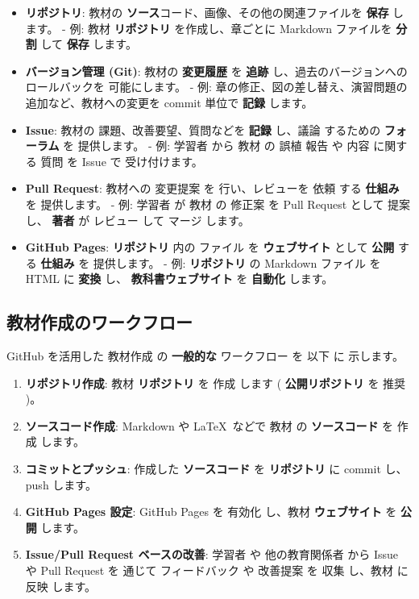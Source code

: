 \begin{itemize}
    \item \textbf{リポジトリ}: 教材の \textbf{ソース}コード、画像、その他の関連ファイルを \textbf{保存} します。
        - 例: 教材 \textbf{リポジトリ} を作成し、章ごとに Markdown ファイルを \textbf{分割} して \textbf{保存} します。
    \item \textbf{バージョン管理 (Git)}: 教材の \textbf{変更履歴} を \textbf{追跡} し、過去のバージョンへのロールバックを 可能にします。
        - 例: 章の修正、図の差し替え、演習問題の追加など、教材への変更を commit 単位で \textbf{記録} します。
    \item \textbf{Issue}: 教材の 課題、改善要望、質問などを \textbf{記録} し、議論 するための \textbf{フォーラム} を 提供します。
        - 例: 学習者 から 教材 の 誤植 報告 や 内容 に関する 質問 を Issue で 受け付けます。
    \item \textbf{Pull Request}: 教材への 変更提案 を 行い、レビューを 依頼 する \textbf{仕組み} を 提供します。
        - 例: 学習者 が 教材 の 修正案 を Pull Request として 提案 し、 \textbf{著者} が レビュー して マージ します。
    \item \textbf{GitHub Pages}: \textbf{リポジトリ} 内の ファイル を \textbf{ウェブサイト} として \textbf{公開} する \textbf{仕組み} を 提供します。
        - 例: \textbf{リポジトリ} の Markdown ファイル を HTML に \textbf{変換} し、 \textbf{教科書ウェブサイト} を \textbf{自動化} します。
\end{itemize}

\subsection{教材作成のワークフロー}

GitHub を活用した 教材作成 の \textbf{一般的な} ワークフロー を 以下 に 示します。

\begin{enumerate}
    \item \textbf{リポジトリ作成}: 教材 \textbf{リポジトリ} を 作成 します ( \textbf{公開リポジトリ} を 推奨 )。
    \item \textbf{ソースコード作成}: Markdown や \LaTeX\  などで 教材 の \textbf{ソースコード} を 作成 します。
    \item \textbf{コミットとプッシュ}: 作成した \textbf{ソースコード} を \textbf{リポジトリ} に commit し、push します。
    \item \textbf{GitHub Pages 設定}: GitHub Pages を 有効化 し、教材 \textbf{ウェブサイト} を \textbf{公開} します。
    \item \textbf{Issue/Pull Request ベースの改善}: 学習者 や 他の教育関係者 から Issue や Pull Request を 通じて フィードバック や 改善提案 を 収集 し、教材 に 反映 します。
\end{enumerate}

